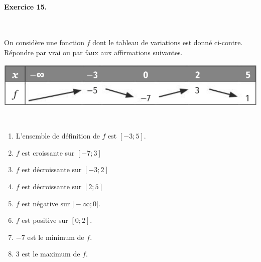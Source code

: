 \documentclass[11pt]{article}
\begin{document}
\paragraph{Exercice 15.}~\\[1mm]
\begin{minipage}{.5\textwidth}
On considère une fonction $f$ dont le tableau de
variations est donné ci-contre. Répondre par vrai ou par faux aux affirmations
suivantes.
\end{minipage}
\begin{minipage}{.5\textwidth}
  \begin{center}
    \includegraphics[scale=.3]{tableauvar.png}
  \end{center}
\end{minipage}
~\\[-9mm]
\begin{multicols}{2}
\begin{enumerate}
  \item L'ensemble de définition de $f$ est $[-3;5]$.
  \item $f$ est croissante sur $[-7;3]$
  \item $f$ est d\'ecroissante sur $[-3;2]$
  \item $f$ est d\'ecroissante sur $[2;5]$
  \item $f$ est négative sur $]-\infty;0]$.
  \item $f$ est positive sur $[0;2]$.
  \item $-7$ est le minimum de $f$.
  \item $3$ est le maximum de $f$.
\end{enumerate}
\end{multicols}
\end{document}

